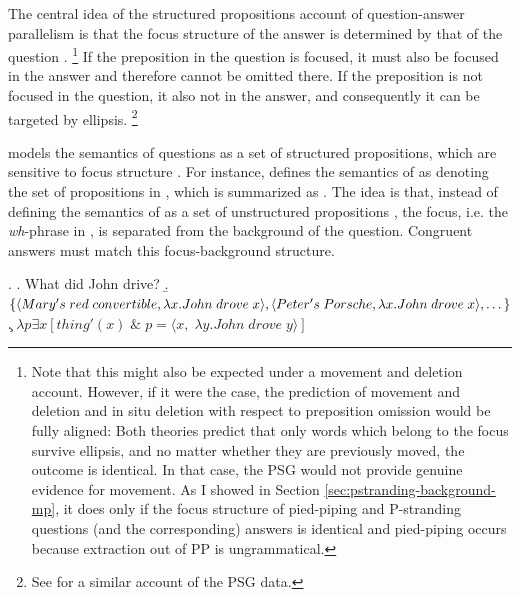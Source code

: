 The central idea of the structured propositions account of question-answer parallelism is that the focus structure of the answer is determined by that of the question \citep{reich2002, reich2002a, reich2007}.%
%
\footnote{Note that this might also be expected under a movement and deletion account. However, if it were the case, the prediction of movement and deletion and in situ deletion with respect to preposition omission would be fully aligned: Both theories predict that only words which belong to the focus survive ellipsis, and no matter whether they are previously moved, the outcome is identical. In that case, the PSG would not provide genuine evidence for movement. As I showed in Section \ref{sec:pstranding-background-mp}, it does only if the focus structure of pied-piping and P-stranding questions (and the corresponding) answers is identical and pied-piping occurs because extraction out of PP is ungrammatical.}\afterfn%
%
If the preposition in the question is focused, it must also be focused in the answer and therefore cannot be omitted there. If the preposition is not focused in the question, it also not in the answer, and consequently it can be targeted by ellipsis.%
%
\footnote{See \citet{griffiths2019} for a similar account of the PSG data.}\afterfn%
%

\citet{reich2002a} models the semantics of questions as a set of structured propositions, which are sensitive to focus structure \citep{vonstechow1981}. For instance, \citet[82]{reich2002a} defines the semantics of \Next[a] as denoting the set of propositions in \Next[b], which is summarized as \Next[c]. The idea is that, instead of defining the semantics of \Next[a] as a set of unstructured propositions \NNext, the focus, i.e. the \textit{wh}-phrase in \Next, is separated from the background of the question. Congruent answers must match this focus-background structure.

\ex. \a. What did John drive? \hfill \citep[82]{reich2002a}
     \b. $\{\langle Mary's\;red\;convertible, \lambda x.John\;drove\;x \rangle,\\
     \langle Peter's\;Porsche, \lambda x.John\;drove\;x \rangle, \dots\}$
     \c. $\lambda p \exists x [thing'(x)\;\&\;p = \langle x,\;\lambda y.John\;drove\;y\rangle]$
     
